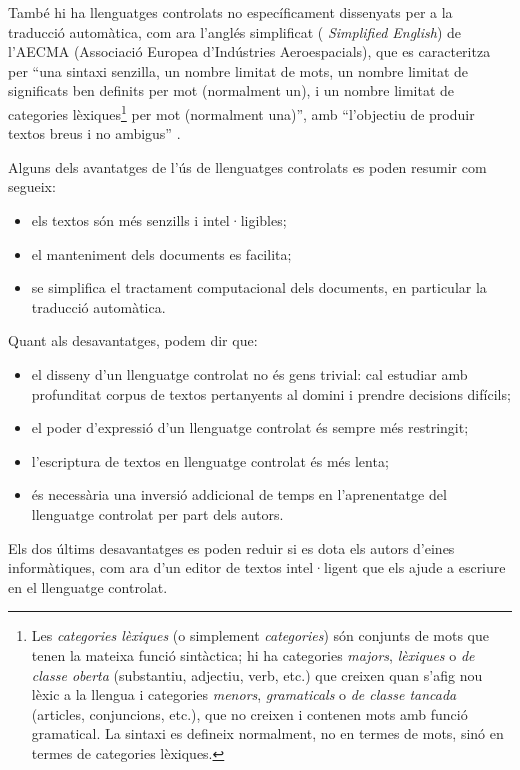 També hi ha llenguatges controlats no específicament dissenyats per a
la traducció automàtica, com ara l'anglés simplificat ({\em
  Simplified English}) de l'AECMA (Associació Europea d'Indústries
Aeroespacials), que es caracteritza per ``una sintaxi senzilla, un
nombre limitat de mots, un nombre limitat de significats ben definits
per mot (normalment un), i un nombre limitat de categories
lèxiques\footnote{Les \emph{categories lèxiques} (o simplement {\em
    categories}) són conjunts de mots que tenen la mateixa funció
  sintàctica; hi ha categories \emph{majors}, \emph{lèxiques} o
  \emph{de classe oberta} (substantiu, adjectiu, verb, etc.) que
  creixen quan s'afig nou lèxic a la llengua i categories
  \emph{menors}, {\em gramaticals} o \emph{de classe tancada}
  (articles, conjuncions, etc.), que no creixen i contenen mots amb
  funció gramatical. La sintaxi es defineix normalment, no en termes
  de mots, sinó en termes de categories lèxiques.}\label{pg:catgra}
per mot (normalment una)'', amb ``l'objectiu de produir textos breus i
no ambigus'' \citep{AECMA07u}.


Alguns dels avantatges de l'ús de llenguatges controlats \citep{schwitten07u} es poden
resumir com segueix:
\begin{itemize}
\item els textos són més senzills i intel·ligibles;
\item el manteniment dels documents es facilita;
\item se simplifica el tractament computacional dels documents,  en
particular la traducció automàtica.
\end{itemize} 
Quant als desavantatges, podem dir que:
\begin{itemize}
\item 
    el disseny d'un llenguatge controlat no és gens trivial: cal
    estudiar amb profunditat corpus de textos pertanyents al domini i
    prendre decisions difícils;
\item el poder d'expressió d'un llenguatge controlat és sempre
més restringit;
\item l'escriptura de textos en llenguatge controlat és més lenta;
\item és necessària una inversió addicional de temps en
l'aprenentatge del llenguatge controlat per part dels autors.  
\end{itemize}  
Els dos últims desavantatges es poden reduir si es dota els autors
d'eines informàtiques, com ara d'un
editor de textos intel·ligent que els ajude a escriure en el llenguatge
controlat.


